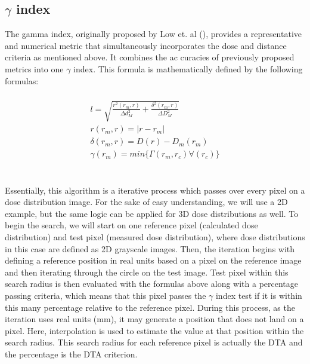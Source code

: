 \documentclass[12pt]{article}
\begin{document}
\subsection{$\gamma$ index}
The gamma index, originally proposed by Low et. al (\textcite{Low}), provides a representative and numerical metric that simultaneously incorporates the dose and distance criteria as mentioned above. It combines the ac curacies of previously proposed metrics into one $\gamma$ index. This formula is mathematically defined by the following formulas:
\\
\\
\begin{align}
  l = \sqrt{\frac{r^{2}(r_{m}, r)}{\Delta d^{2}_{M}} + \frac{\delta^{2}(r_{m}, r)}{\Delta D^{2}_{M}}} \\
  r(r_{m}, r) = \lvert r-r_{m} \lvert \\
  \delta(r_{m}, r) = D(r)-D_{m}(r_{m}) \\
  \gamma(r_{m}) = min\{\Gamma(r_{m}, r_{c})\forall(r_{c})\}
\end{align}
\\
\\
Essentially, this algorithm is a iterative process which passes over every pixel on a dose distribution image. For the sake of easy understanding, we will use a 2D example, but the same logic can be applied for 3D dose distributions as well. To begin the search, we will start on one reference pixel (calculated dose distribution) and test pixel (measured dose distribution), where dose distributions in this case are defined as 2D grayscale images. Then, the iteration begins with defining a reference position in real units based on a pixel on the reference image and then iterating through the circle on the test image. Test pixel within this search radius is then evaluated with the formulas above along with a percentage passing criteria, which means that this pixel passes the $\gamma$ index test if it is within this many percentage relative to the reference pixel. During this process, as the iteration uses real units (mm), it may generate a position that does not land on a pixel. Here, interpolation is used to estimate the value at that position within the search radius. This search radius for each reference pixel is actually the DTA and the percentage is the DTA criterion.
\end{document}
